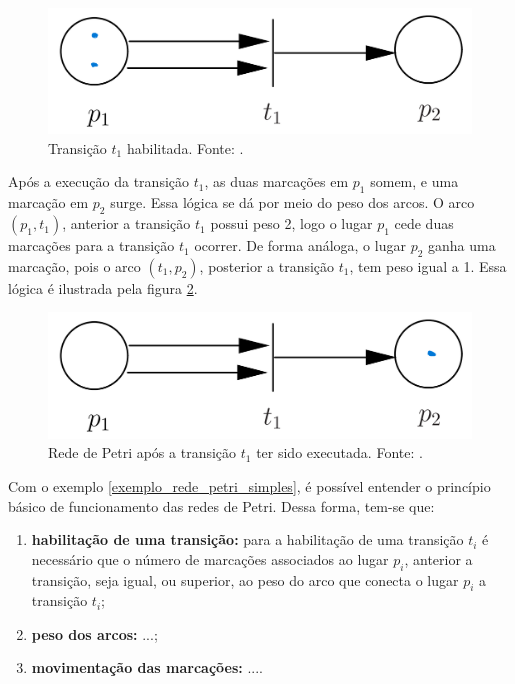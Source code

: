 \documentclass[
	12pt,				%
	openright,			%
	oneside,			%
	a4paper,			%
	english,			%
	brazil				%
	]{abntex2}
\begin{document}
\newpage

\begin{figure}[ht] 
	\centering
	\includegraphics[scale=0.3]{exemplo_simples_rede_petri_marcacao_p1.png}
	\caption[Rede de Petri Simples]{Transição $t_{1}$ habilitada. Fonte: \textcite{CassandrasLafortune08}.}
	\label{fig:rede_petri_simples_ex_02}
\end{figure}

Após a execução da transição $t_{1}$, as duas marcações em $p_{1}$ somem, e uma marcação em $p_{2}$ surge. Essa lógica se dá por meio do peso dos arcos. O arco $(p_{1},t_{1})$, anterior a transição $t_{1}$ possui peso 2, logo o lugar $p_{1}$ cede duas marcações para a transição $t_{1}$ ocorrer. De forma análoga, o lugar $p_{2}$ ganha uma marcação, pois o arco $(t_{1},p_{2})$, posterior a transição $t_{1}$, tem peso igual a 1. Essa lógica é ilustrada pela figura \ref{fig:rede_petri_simples_ex_03}.

\begin{figure}[ht] 
	\centering
	\includegraphics[scale=0.3]{exemplo_simples_rede_petri_marcacao_p2.png}
	\caption[Rede de Petri Simples]{Rede de Petri após a transição $t_{1}$ ter sido executada. Fonte: \textcite{CassandrasLafortune08}.}
	\label{fig:rede_petri_simples_ex_03}
\end{figure}


Com o exemplo \ref{exemplo_rede_petri_simples}, é possível entender o princípio básico de funcionamento das redes de Petri. Dessa forma, tem-se que:

 \begin{enumerate}[label=(\alph*)]
    \item \textbf{habilitação de uma transição:} para a habilitação de uma transição $t_{i}$ é necessário que o número de marcações associados ao lugar $p_{i}$, anterior a transição, seja igual, ou superior, ao peso do arco que conecta o lugar $p_{i}$ a transição $t_{i}$;
    \item \textbf{peso dos arcos:} ...;
    \item \textbf{movimentação das marcações:} ....
\end{enumerate}
\end{document}
